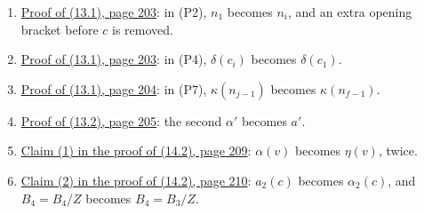 \begin{enumerate}
graphs, not hypergraphs, and the proof applies [2, (3.1)] to the graph obtained from $H$ by
subdividing every edge twice.
\item {}\hyperref[fix:13.1-P2]{Proof of (13.1), page 203}: in (P2), $n_1$ becomes $n_i$, and an
extra opening bracket before $c$ is removed.
\item {}\hyperref[fix:13.1-P4]{Proof of (13.1), page 203}: in (P4), $\delta(c_i)$ becomes
$\delta(c_1)$.
\item {}\hyperref[fix:13.1-P7]{Proof of (13.1), page 204}: in (P7), $\kappa(n_{j-1})$ becomes
$\kappa(n_{f-1})$.
\item {}\hyperref[fix:13.2-proof]{Proof of (13.2), page 205}: the second $\alpha'$ becomes $a'$.
\item {}\hyperref[fix:14.2-claim1]{Claim (1) in the proof of (14.2), page 209}: $\alpha(v)$
becomes $\eta(v)$, twice.
\item {}\hyperref[fix:14.2-claim2]{Claim (2) in the proof of (14.2), page 210}: $a_2(c)$ becomes
$\alpha_2(c)$, and $B_4 = B_4/Z$ becomes $B_4 = B_3/Z$.
\end{enumerate}
